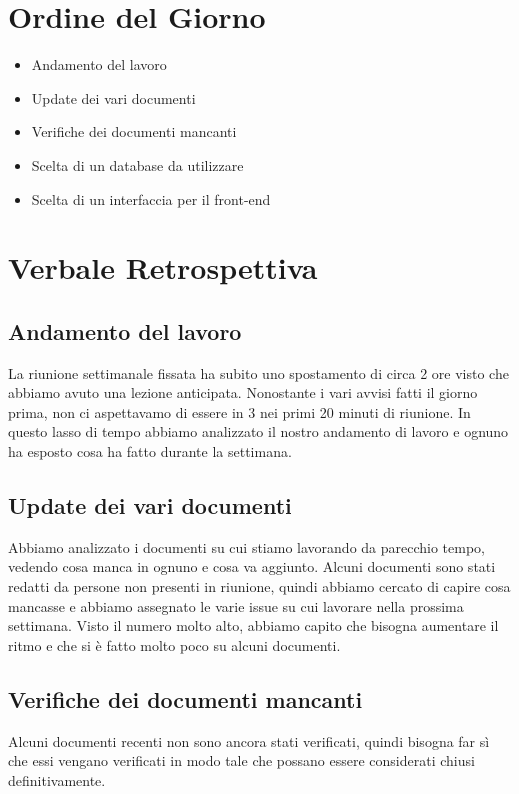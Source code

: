 \documentclass{article}
\begin{document}
\section{Ordine del Giorno}
\begin{itemize}
    \item Andamento del lavoro
    \item Update dei vari documenti 
    \item Verifiche dei documenti mancanti
    \item Scelta di un database da utilizzare
    \item Scelta di un interfaccia per il front-end
\end{itemize}


\newpage
\section{Verbale Retrospettiva}
\subsection{Andamento del lavoro}
La riunione settimanale fissata ha subito uno spostamento di circa 2 ore visto che abbiamo avuto una lezione anticipata. Nonostante i vari avvisi fatti il giorno prima, non ci aspettavamo di essere in 3 nei primi 20 minuti di riunione. In questo lasso di tempo abbiamo analizzato il nostro andamento di lavoro e ognuno ha esposto cosa ha fatto durante la settimana.
\subsection{Update dei vari documenti}
Abbiamo analizzato i documenti su cui stiamo lavorando da parecchio tempo, vedendo cosa manca in ognuno e cosa va aggiunto. Alcuni documenti sono stati redatti da persone non presenti in riunione, quindi abbiamo cercato di capire cosa mancasse e abbiamo assegnato le varie issue su cui lavorare nella prossima settimana. Visto il numero molto alto, abbiamo capito che bisogna aumentare il ritmo e che si è fatto molto poco su alcuni documenti.
\subsection{Verifiche dei documenti mancanti}
Alcuni documenti recenti non sono ancora stati verificati, quindi bisogna far sì che essi vengano verificati in modo tale che possano essere considerati chiusi definitivamente.
\end{document}
